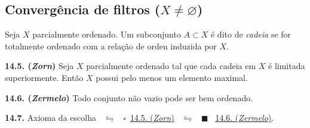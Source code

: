 %



\subsection*{Convergência de filtros (\(X \neq \varnothing\))}

\begin{definition}
    Seja \(X\) parcialmente ordenado. Um subconjunto \(A \subset X\) é dito de \emph{cadeia} se for totalmente ordenado com a relação de orden induzida por \(X\). 
\end{definition}

\hypertarget{lemma145}{}
\begin{lemma}
    \textbf{14.5. (\emph{Zorn})} Seja \(X\) parcialmente ordenado tal que cada cadeia em \(X\) é limitada superiormente. Então \(X\) possui pelo menos um elemento maximal.
\end{lemma}

\hypertarget{thm146}{}
\begin{theorem}
    \textbf{14.6. (\emph{Zermelo})} Todo conjunto não vazio pode ser bem ordenado.
\end{theorem}

\begin{theorem}
    \textbf{14.7.} Axioma da escolha \ \(\leftrightharpoons\) \ {\scriptsize $\square$}\ \hyperlink{lemma145}{14.5. (\emph{Zorn})} \ \(\leftrightharpoons\) \ \(\blacksquare\) \ \hyperlink{thm146}{14.6. (\emph{Zermelo})}. 
\end{theorem}

